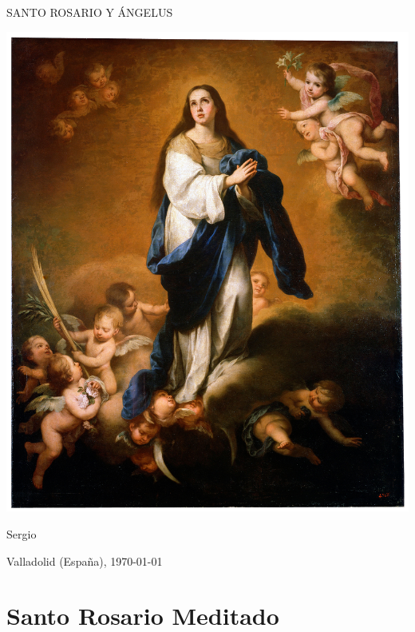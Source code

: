 \documentclass[10pt,twoside]{book}
\begin{document}
\begin{titlepage}
      \begin{center}

            \vspace*{10em}

            {\Huge \uppercase{Santo Rosario y Ángelus}}
            
            \vspace{1.5em}
            
            {\includegraphics[scale=0.75]{foto-04.jpg}}
            
            \vspace{0.5em}
            
            Sergio

            Valladolid (España), \monthyeardate\today
      \end{center}
\end{titlepage}
\chapter*{Santo Rosario Meditado}
\end{document}

